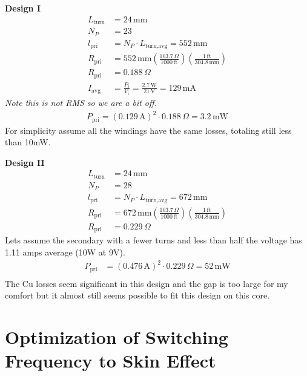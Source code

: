 \documentclass{article}
\begin{document}
\begin{minipage}[t]{0.45\linewidth}
    \textbf{Design I}
    \begin{align*}
    L_{\text{turn}} &= 24 \, \text{mm} \\
    N_P &= 23 \\
    l_{\text{pri}} &= N_P \cdot L_{\text{turn,avg}} = 552 \, \text{mm} \\
    R_{\text{pri}} &= 552 \, \text{mm} \left(\frac{103.7 \, \Omega}{1000 \, \text{ft}}\right) \left(\frac{1 \, \text{ft}}{304.8 \, \text{mm}}\right) \\
    R_{\text{pri}} &= 0.188 \, \Omega \\
    I_{\text{avg}} &= \frac{P_i}{V_i} = \frac{2.7 \, \text{W}}{21 \, \text{V}} = 129 \, \text{mA}
    \end{align*}
    \emph{Note this is not RMS so we are a bit off.}
    \begin{align*}
    P_{\text{pri}} = (0.129 \, \text{A})^2 \cdot 0.188 \, \Omega = 3.2 \, \text{mW}
    \end{align*}
    For simplicity assume all the windings have the same losses, totaling still less than 10mW.
\end{minipage}
\begin{minipage}[t]{0.45\linewidth}
    \textbf{Design II}
    \begin{align*}
    L_{\text{turn}} &= 24 \, \text{mm} \\
    N_P &= 28 \\
    l_{\text{pri}} &= N_P \cdot L_{\text{turn,avg}} = 672 \, \text{mm} \\
    R_{\text{pri}} &= 672 \, \text{mm} \left(\frac{103.7 \, \Omega}{1000 \, \text{ft}}\right) \left(\frac{1 \, \text{ft}}{304.8 \, \text{mm}}\right) \\
    R_{\text{pri}} &= 0.229 \, \Omega 
    \end{align*}
    Lets assume the secondary with a fewer turns and less than half the voltage has 1.11 amps average (10W at 9V).
    \begin{align*}
    P_{\text{pri}} &= (0.476 \, \text{A})^2 \cdot 0.229 \, \Omega = 52 \, \text{mW} \\
    \end{align*}
    The Cu losses seem significant in this design and the gap is too large for my comfort but it almost still seems possible to fit this design on this core.
\end{minipage}

\section{Optimization of Switching Frequency to Skin Effect}
\end{document}
